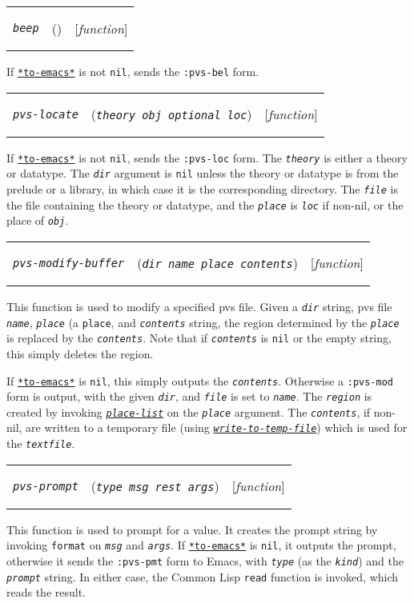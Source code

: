 \documentclass[12pt]{book}
\makeatletter
\def\ampoptional{{\smaller\sc {\smaller\smaller \&}optional\ }}
\def\amprest{{\smaller\sc {\smaller\smaller \&}rest\ }}
\newenvironment{function}[3]%
{\par\noindent\begin{boxedminipage}{\textwidth}%
 \par\noindent\begin{tabularx}{\linewidth}{l>{\raggedright}Xr}%
 \functionhtgt{#1}&(\texttt{\textit{#2}})&[\emph{#3}]%
 \end{tabularx}\par\flushright\begin{minipage}{.97\textwidth}}
{\end{minipage}\end{boxedminipage}}
\newcommand{\functionnm}[1]{\texttt{\textit{#1}}}
\newcommand{\functionhln}[1]{\hyperlink{#1}{\functionnm{#1}}}
\newcommand{\functionhtgt}[1]{\hypertarget{#1}{\functionnm{#1}}\index{#1@\functionnm{#1}|underline}}
\newenvironment{lispfunction}[2]%
{\begin{function}{#1}{#2}{function}}{\end{function}}
\newcommand{\classnm}[1]{\texttt{\textup{#1}}}
\newcommand{\globalnm}[1]{\texttt{\textup{#1}}}
\newcommand{\globalhln}[1]{\hyperlink{#1}{\globalnm{#1}}}
\makeatother
\begin{document}
\begin{lispfunction}{beep}{}
If \globalhln{*to-emacs*} is not \texttt{nil}, sends the \texttt{:pvs-bel}
form.
\end{lispfunction}

\begin{lispfunction}{pvs-locate}{theory obj \ampoptional loc}
If \globalhln{*to-emacs*} is not \texttt{nil}, sends the \texttt{:pvs-loc}
form.  The \functionnm{theory} is either a theory or datatype.  The
\functionnm{dir} argument is \texttt{nil} unless the theory or datatype is
from the prelude or a library, in which case it is the corresponding
directory.  The \functionnm{file} is the file containing the theory or
datatype, and the \functionnm{place} is \functionnm{loc} if non-nil, or
the place of \functionnm{obj}.
\end{lispfunction}

\begin{lispfunction}{pvs-modify-buffer}{dir name place contents}
This function is used to modify a specified pvs file.  Given a
\functionnm{dir} string, pvs file \functionnm{name}, \functionnm{place} (a
\classnm{place}, and \functionnm{contents} string, the region determined
by the \functionnm{place} is replaced by the \functionnm{contents}.  Note
that if \functionnm{contents} is \texttt{nil} or the empty string, this
simply deletes the region.

If \globalhln{*to-emacs*} is \texttt{nil}, this simply outputs the
\functionnm{contents}.  Otherwise a \texttt{:pvs-mod} form is output, with
the given \functionnm{dir}, and \functionnm{file} is set to
\functionnm{name}.  The \functionnm{region} is created by invoking
\functionhln{place-list} on the \functionnm{place} argument.  The
\functionnm{contents}, if non-nil, are written to a temporary file (using
\functionhln{write-to-temp-file}) which is used for the
\functionnm{textfile}.
\end{lispfunction}

\begin{lispfunction}{pvs-prompt}{type msg \amprest args}
This function is used to prompt for a value.  It creates the prompt string
by invoking \texttt{format} on \functionnm{msg} and \functionnm{args}.  If
\globalhln{*to-emacs*} is \texttt{nil}, it outputs the prompt, otherwise
it sends the \texttt{:pvs-pmt} form to Emacs, with \functionnm{type} (as
the \functionnm{kind}) and the \functionnm{prompt} string.  In either
case, the Common Lisp \texttt{read} function is invoked, which reads the
result.
\end{lispfunction}
\end{document}
